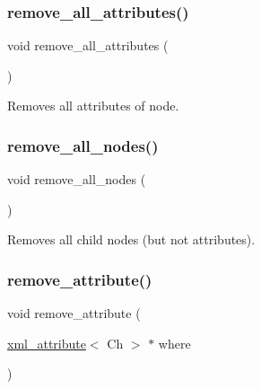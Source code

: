 \subsubsection{\texorpdfstring{remove\+\_\+all\+\_\+attributes()}{remove\_all\_attributes()}}
{\footnotesize\ttfamily void remove\+\_\+all\+\_\+attributes (\begin{DoxyParamCaption}{ }\end{DoxyParamCaption})\hspace{0.3cm}{\ttfamily [inline]}}



Removes all attributes of node. 

\mbox{\label{classrapidxml_1_1xml__node_a0218147d13e41d5fa60ced4e7a7e9726}} 
\subsubsection{\texorpdfstring{remove\+\_\+all\+\_\+nodes()}{remove\_all\_nodes()}}
{\footnotesize\ttfamily void remove\+\_\+all\+\_\+nodes (\begin{DoxyParamCaption}{ }\end{DoxyParamCaption})\hspace{0.3cm}{\ttfamily [inline]}}



Removes all child nodes (but not attributes). 

\mbox{\label{classrapidxml_1_1xml__node_ac75154db2e768c0e5b541fc8cd0775ab}} 
\subsubsection{\texorpdfstring{remove\+\_\+attribute()}{remove\_attribute()}}
{\footnotesize\ttfamily void remove\+\_\+attribute (\begin{DoxyParamCaption}\item[{\mbox{\hyperlink{classrapidxml_1_1xml__attribute}{xml\+\_\+attribute}}$<$ Ch $>$ $\ast$}]{where }\end{DoxyParamCaption})\hspace{0.3cm}{\ttfamily [inline]}}



